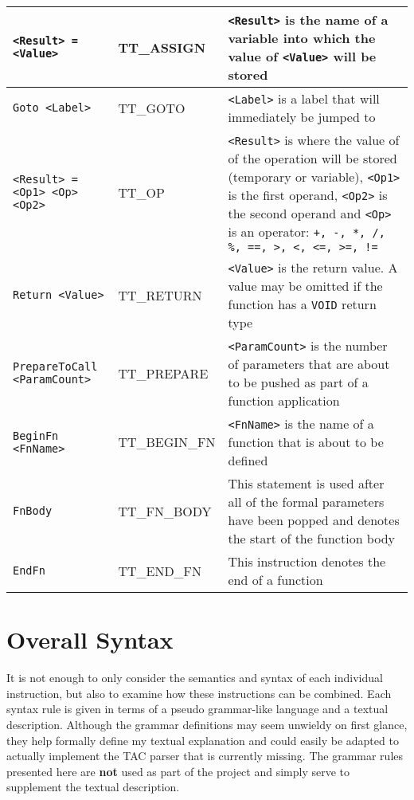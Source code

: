 \begin{longtable}{|p{5.5cm}|p{3.5cm}|p{7cm}|}
	\verb!<Result> = <Value>! & TT\_ASSIGN & \verb!<Result>! is the name of a variable into which the value of \verb!<Value>! will be stored\\ \hline
	\verb!Goto <Label>! & TT\_GOTO & \verb!<Label>! is a label that will immediately be jumped to\\ \hline
	\verb!<Result> = <Op1> <Op> <Op2>! & TT\_OP & \verb!<Result>! is where the value of of the operation will be stored (temporary or variable), \verb!<Op1>! is the first operand, \verb!<Op2>! is the second operand and \verb!<Op>! is an operator: \verb`+, -, *, /, %, ==, >, <, <=, >=, !=`\\ \hline
	\verb!Return <Value>! & TT\_RETURN & \verb!<Value>! is the return value. A value may be omitted if the function has a \verb!VOID! return type\\ \hline
	\verb!PrepareToCall <ParamCount>! & TT\_PREPARE & \verb!<ParamCount>! is the number of parameters that are about to be pushed as part of a function application\\ \hline
	\verb!BeginFn <FnName>! & TT\_BEGIN\_FN & \verb!<FnName>! is the name of a function that is about to be defined\\ \hline	
	\verb!FnBody! & TT\_FN\_BODY & This statement is used after all of the formal parameters have been popped and denotes the start of the function body\\ \hline
	\verb!EndFn! & TT\_END\_FN & This instruction denotes the end of a function\\ \hline	
\end{longtable}

\section{Overall Syntax}

It is not enough to only consider the semantics and syntax of each individual instruction, but also to examine how these instructions can be combined. Each syntax rule is given in terms of a pseudo grammar-like language and a textual description. Although the grammar definitions may seem unwieldy on first glance, they help formally define my textual explanation and could easily be adapted to actually implement the TAC parser that is currently missing. The grammar rules presented here are \textbf{not} used as part of the project and simply serve to supplement the textual description.

